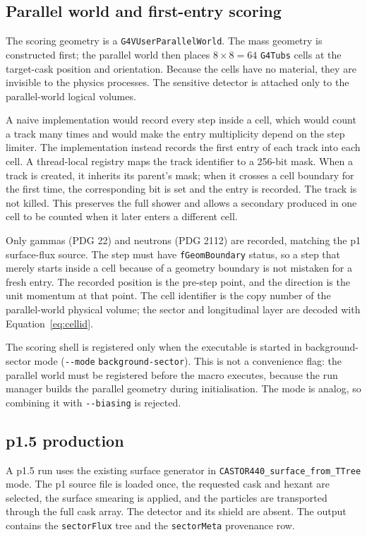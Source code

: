 \documentclass[11pt,a4paper]{article}
\begin{document}
\subsection{Parallel world and first-entry scoring}

The scoring geometry is a \texttt{G4VUserParallelWorld}. The mass geometry is
constructed first; the parallel world then places $8\times 8=64$ \texttt{G4Tubs}
cells at the target-cask position and orientation. Because the cells have no
material, they are invisible to the physics processes. The sensitive detector is
attached only to the parallel-world logical volumes.

A naive implementation would record every step inside a cell, which would count
a track many times and would make the entry multiplicity depend on the step
limiter. The implementation instead records the first entry of each track into
each cell. A thread-local registry maps the track identifier to a 256-bit mask.
When a track is created, it inherits its parent's mask; when it crosses a cell
boundary for the first time, the corresponding bit is set and the entry is
recorded. The track is not killed. This preserves the full shower and allows a
secondary produced in one cell to be counted when it later enters a different
cell.

Only gammas (PDG 22) and neutrons (PDG 2112) are recorded, matching the p1
surface-flux source. The step must have \texttt{fGeomBoundary} status, so a step
that merely starts inside a cell because of a geometry boundary is not mistaken
for a fresh entry. The recorded position is the pre-step point, and the
direction is the unit momentum at that point. The cell identifier is the copy
number of the parallel-world physical volume; the sector and longitudinal layer
are decoded with Equation~\eqref{eq:cellid}.

The scoring shell is registered only when the executable is started in
background-sector mode (\texttt{-{}-mode} \texttt{background-sector}). This is
not a convenience flag: the parallel world must be registered before the macro
executes, because the run manager builds the parallel geometry during
initialisation. The mode is analog, so combining it with \texttt{-{}-biasing} is
rejected.

\subsection{p1.5 production}

A p1.5 run uses the existing surface generator in
\texttt{CASTOR440\_surface\_from\_TTree} mode. The p1 source file is loaded once,
the requested cask and hexant are selected, the surface smearing is applied, and
the particles are transported through the full cask array. The detector and its
shield are absent. The output contains the \texttt{sectorFlux} tree and the
\texttt{sectorMeta} provenance row.
\end{document}
